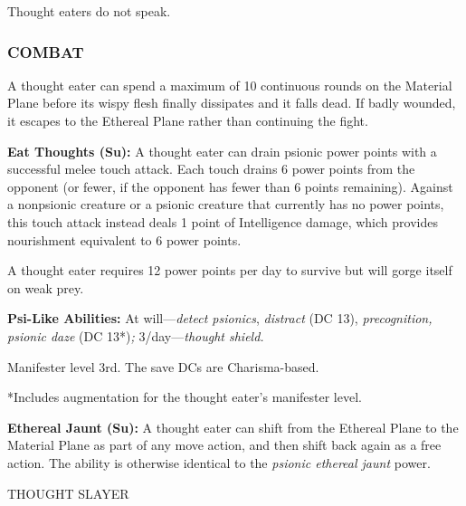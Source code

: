 \documentclass{article}
\begin{document}
Thought eaters do not speak.

\subsubsection*{COMBAT}

A thought eater can spend a maximum of 10 continuous rounds on the Material Plane 
before its wispy flesh finally dissipates and it falls dead. If badly wounded, 
it escapes to the Ethereal Plane rather than continuing the fight.

\textbf{Eat Thoughts (Su):} A thought eater can drain psionic power points with 
a successful melee touch attack. Each touch drains 6 power points from the opponent 
(or fewer, if the opponent has fewer than 6 points remaining). Against a nonpsionic 
creature or a psionic creature that currently has no power points, this touch attack 
instead deals 1 point of Intelligence damage, which provides nourishment equivalent 
to 6 power points.

A thought eater requires 12 power points per day to survive but will gorge itself 
on weak prey.

\textbf{Psi-Like Abilities:} At will---\textit{detect psionics}, \textit{distract 
}(DC 13), \textit{precognition, psionic daze }(DC 13*)\textit{; }3/day---\textit{thought 
shield. }

Manifester level 3rd. The save DCs are Charisma-based.

*Includes augmentation for the thought eater's manifester level.

\textbf{Ethereal Jaunt (Su): }A thought eater can shift from the Ethereal Plane 
to the Material Plane as part of any move action, and then shift back again as 
a free action. The ability is otherwise identical to the \textit{psionic ethereal 
jaunt }power.

\vspace{12pt}
{\LARGE{}THOUGHT SLAYER}
\end{document}

